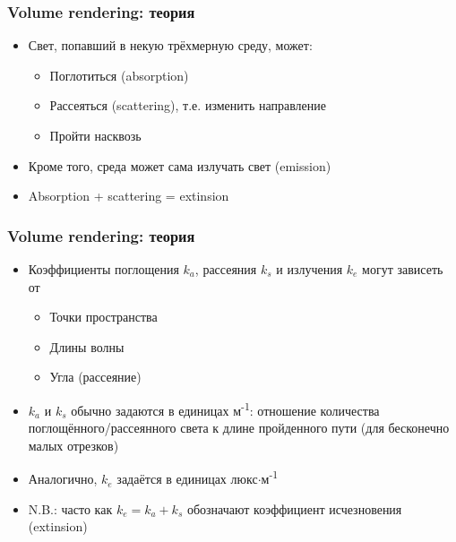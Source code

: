 \documentclass{beamer}
\begin{document}
\begin{frame}[fragile]
\frametitle{Volume rendering: теория}
\begin{itemize}
\item Свет, попавший в некую трёхмерную среду, может:
\pause
\begin{itemize}
\item Поглотиться (absorption)
\pause
\item Рассеяться (scattering), т.е. изменить направление
\pause
\item Пройти насквозь
\end{itemize}
\pause
\item Кроме того, среда может сама излучать свет (emission)
\pause
\item Absorption + scattering = extinsion
\end{itemize}
\end{frame}

\begin{frame}[fragile]
\frametitle{Volume rendering: теория}
\begin{itemize}
\item Коэффициенты поглощения \begin{math}k_a\end{math}, рассеяния \begin{math}k_s\end{math} и излучения \begin{math}k_e\end{math} могут зависеть от
\pause
\begin{itemize}
\item Точки пространства
\pause
\item Длины волны
\pause
\item Угла (рассеяние)
\end{itemize}
\pause
\item \begin{math}k_a\end{math} и \begin{math}k_s\end{math} обычно задаются в единицах м\textsuperscript{-1}: отношение количества поглощённого/рассеянного света к длине пройденного пути (для бесконечно малых отрезков)
\pause
\item Аналогично, \begin{math}k_e\end{math} задаётся в единицах люкс\begin{math}\cdot\end{math}м\textsuperscript{-1}
\pause
\item N.B.: часто как \begin{math}k_e = k_a + k_s\end{math} обозначают коэффициент исчезновения (extinsion)
\end{itemize}
\end{frame}
\end{document}
